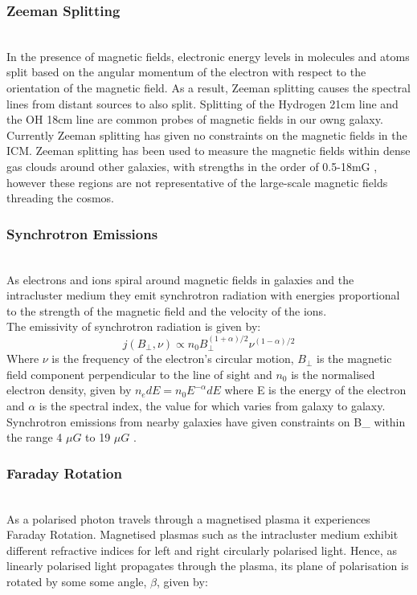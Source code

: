 \subsubsection*{Zeeman Splitting}
\\
In the presence of magnetic fields, electronic energy levels in molecules and atoms split based on the angular momentum of the electron with respect to the orientation of the magnetic field. As a result, Zeeman splitting causes the spectral lines from distant sources to also split. Splitting of the Hydrogen 21cm line and the OH 18cm line are common probes of magnetic fields in our owng galaxy. Currently Zeeman splitting has given no constraints on the magnetic fields in the ICM. Zeeman splitting has been used to measure the magnetic fields within dense gas clouds around other galaxies, with strengths in the order of 0.5-18mG \cite{Robishaw:2008ti}, however these regions are not representative of the large-scale magnetic fields threading the cosmos.
\subsubsection*{Synchrotron Emissions}
\\
As electrons and ions spiral around magnetic fields in galaxies and the intracluster medium they emit synchrotron radiation with energies proportional to the strength of the magnetic field and the velocity of the ions.
\\
The emissivity of synchrotron radiation is given by:
\begin{equation}
j(B_{\bot},\nu) \propto n_0 B_{\bot}^{(1+\alpha)/2} \nu ^{(1-\alpha)/2}
\end{equation}
Where $\nu$ is the frequency of the electron's circular motion, $B_{\bot}$ is the magnetic field component perpendicular to the line of sight and $n_0$ is the normalised electron density, given by $n_e dE = n_0 E^{-\alpha} dE$ where E is the energy of the electron and $\alpha$ is the spectral index, the value for which varies from galaxy to galaxy.
\\
Synchrotron emissions from nearby galaxies have given constraints on B_{\bot} within the range 4 $\mu G$ to 19 $\mu G$ \cite{Giovannini:2003yn}.
\subsubsection*{Faraday Rotation}
\\
As a polarised photon travels through a magnetised plasma it experiences Faraday Rotation. Magnetised plasmas such as the intracluster medium exhibit different refractive indices for left and right circularly polarised light. Hence, as linearly polarised light propagates through the plasma, its plane of polarisation is rotated by some some angle, $\beta$, given by:

